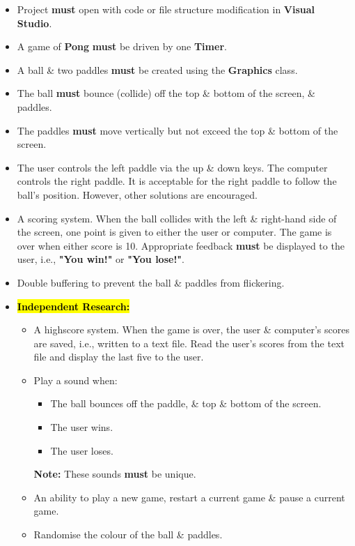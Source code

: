 \documentclass{article}
\begin{document}
\begin{itemize}
    \item Project \textbf{must} open with code or file structure modification in \textbf{Visual Studio}.
    \item A game of \textbf{Pong} \textbf{must} be driven by one \textbf{Timer}.
    \item A ball \& two paddles \textbf{must} be created using the \textbf{Graphics} class.
    \item The ball \textbf{must} bounce (collide) off the top \& bottom of the screen, \& paddles.
    \item The paddles \textbf{must} move vertically but not exceed the top \& bottom of the screen.
    \item The user controls the left paddle via the up \& down keys. The computer controls the right paddle. It is acceptable for the right paddle to follow the ball's position. However, other solutions are encouraged.
    \item A scoring system. When the ball collides with the left \& right-hand side of the screen, one point is given to either the user or computer. The game is over when either score is 10. Appropriate feedback \textbf{must} be displayed to the user, i.e., \textbf{"You win!"} or \textbf{"You lose!"}.
    \item Double buffering to prevent the ball \& paddles from flickering.
    \item \hl{\textbf{Independent Research:}}
    \begin{itemize}
        \item A highscore system. When the game is over, the user \& computer's scores are saved, i.e., written to a text file. Read the user's scores from the text file and display the last five to the user.
        \item Play a sound when:
        \begin{itemize}
            \item The ball bounces off the paddle, \& top \& bottom of the screen.
            \item The user wins.
            \item The user loses.
        \end{itemize}
        \textbf{Note:} These sounds \textbf{must} be unique.
        \item An ability to play a new game, restart a current game \& pause a current game.
        \item Randomise the colour of the ball \& paddles.
    \end{itemize}
\end{itemize}
\end{document}
